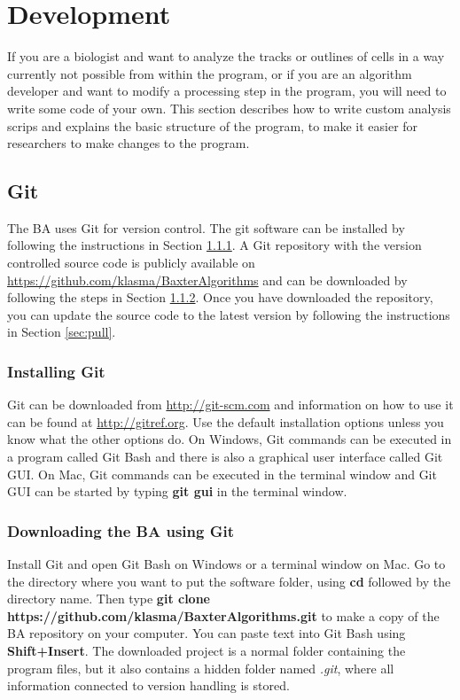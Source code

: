 \documentclass[a4paper, oneside, onecolumn, 11pt]{article}
\newcommand{\file}[1]{\emph{#1}}
\newcommand{\command}[1]{\textbf{#1}}
\begin{document}
\section{Development}
If you are a biologist and want to analyze the tracks or outlines of cells in a way currently not possible from within the program, or if you are an algorithm developer and want to modify a processing step in the program, you will need to write some code of your own. This section describes how to write custom analysis scrips and explains the basic structure of the program, to make it easier for researchers to make changes to the program.

\subsection{Git}
\label{sec:git}
The BA uses Git for version control. The git software can be installed by following the instructions in Section \ref{sec:install-git}. A Git repository with the version controlled source code is publicly available on \url{https://github.com/klasma/BaxterAlgorithms} and can be downloaded by following the steps in Section \ref{sec:clone}. Once you have downloaded the repository, you can update the source code to the latest version by following the instructions in Section \ref{sec:pull}.

\subsubsection{Installing Git}
\label{sec:install-git}
Git can be downloaded from \url{http://git-scm.com} and information on how to use it can be found at \url{http://gitref.org}. Use the default installation options unless you know what the other options do. On Windows, Git commands can be executed in a program called Git Bash and there is also a graphical user interface called Git GUI. On Mac, Git commands can be executed in the terminal window and Git GUI can be started by typing \command{git gui} in the terminal window.

\subsubsection{Downloading the BA using Git}
\label{sec:clone}
Install Git and open Git Bash on Windows or a terminal window on Mac. Go to the directory where you want to put the software folder, using \command{cd} followed by the directory name. Then type \command{git clone https://\allowbreak github.com/\allowbreak klasma/\allowbreak BaxterAlgorithms.git} to make a copy of the BA repository on your computer. You can paste text into Git Bash using \command{Shift+Insert}. The downloaded project is a normal folder containing the program files, but it also contains a hidden folder named \file{.git}, where all information connected to version handling is stored.
\end{document}
